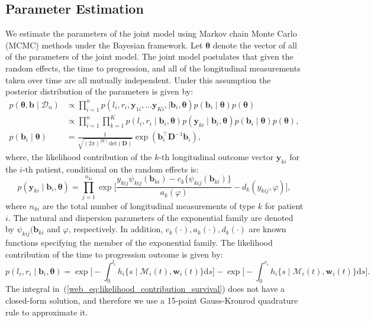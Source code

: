 \subsection{Parameter Estimation}
We estimate the parameters of the joint model using Markov chain Monte Carlo (MCMC) methods under the Bayesian framework. Let $\boldsymbol{\theta}$ denote the vector of all of the parameters of the joint model. The joint model postulates that given the random effects, the time to progression, and all of the longitudinal measurements taken over time are all mutually independent. Under this assumption the posterior distribution of the parameters is given by:
\begin{align*}
p(\boldsymbol{\theta}, \boldsymbol{b} \mid \mathcal{D}_n) & \propto \prod_{i=1}^n p(l_i, r_i, \boldsymbol{y}_{1i},\ldots \boldsymbol{y}_{Ki}, \mid \boldsymbol{b}_i, \boldsymbol{\theta}) p(\boldsymbol{b}_i \mid \boldsymbol{\theta}) p(\boldsymbol{\theta})\\
& \propto \prod_{i=1}^n \prod_{k=1}^K p(l_i, r_i \mid \boldsymbol{b}_i, \boldsymbol{\theta})  p(\boldsymbol{y}_{ki} \mid \boldsymbol{b}_{i}, \boldsymbol{\theta}) p(\boldsymbol{b}_i \mid \boldsymbol{\theta}) p(\boldsymbol{\theta}),\\
p(\boldsymbol{b}_i \mid \boldsymbol{\theta}) &= \frac{1}{\sqrt{(2 \pi)^{\mid W \mid} \text{det}(\boldsymbol{D})}} \exp(\boldsymbol{b}_i^{\top} \boldsymbol{D}^{-1} \boldsymbol{b}_i),
\end{align*}
where, the likelihood contribution of the ${k\mbox{-th}}$ longitudinal outcome vector $\boldsymbol{y}_{ki}$ for the ${i\mbox{-th}}$ patient, conditional on the random effects is:
\begin{equation*}
p(\boldsymbol{y}_{ki} \mid \boldsymbol{b}_i, \boldsymbol{\theta}) = \prod_{j=1}^{n_{ki}} \exp\Bigg[\frac{y_{kij} \psi_{kij}(\boldsymbol{b}_{ki}) - c_k\big\{\psi_{kij}(\boldsymbol{b}_{ki})\big\}}{a_k(\varphi)} - d_k(y_{kij}, \varphi)\Bigg],
\end{equation*}
where $n_{ki}$ are the total number of longitudinal measurements of type $k$ for patient $i$. The natural and dispersion parameters of the exponential family are denoted by $\psi_{kij}(\boldsymbol{b}_{ki}$ and $\varphi$, respectively. In addition, $c_k(\cdot), a_k(\cdot), d_k(\cdot)$ are known functions specifying the member of the exponential family. The likelihood contribution of the time to progression outcome is given by:
\begin{equation}
\label{web_eq:likelihood_contribution_survival}
p(l_i,r_i\mid \boldsymbol{b}_i,\boldsymbol{\theta}) = \exp\Big[-\int_0^{l_i} h_i\big\{s \mid \mathcal{M}_i(t), \boldsymbol{w}_i(t)\big\}\mathrm{d}{s}\Big] - \exp\Big[-\int_0^{r_i}h_i\big\{s \mid \mathcal{M}_i(t), \boldsymbol{w}_i(t)\big\}\mathrm{d}{s}\Big].
\end{equation}
The integral in~(\ref{web_eq:likelihood_contribution_survival}) does not have a closed-form solution, and therefore we use a 15-point Gauss-Kronrod quadrature rule to approximate it.

